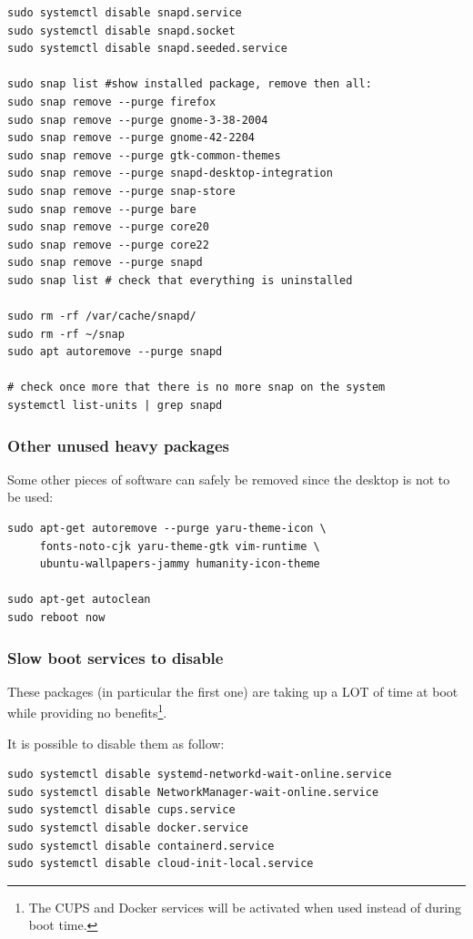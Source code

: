 \documentclass[10pt]{article}
\begin{document}
\begin{verbatim}
sudo systemctl disable snapd.service
sudo systemctl disable snapd.socket
sudo systemctl disable snapd.seeded.service

sudo snap list #show installed package, remove then all:
sudo snap remove --purge firefox
sudo snap remove --purge gnome-3-38-2004
sudo snap remove --purge gnome-42-2204
sudo snap remove --purge gtk-common-themes
sudo snap remove --purge snapd-desktop-integration
sudo snap remove --purge snap-store
sudo snap remove --purge bare
sudo snap remove --purge core20
sudo snap remove --purge core22
sudo snap remove --purge snapd
sudo snap list # check that everything is uninstalled

sudo rm -rf /var/cache/snapd/
sudo rm -rf ~/snap
sudo apt autoremove --purge snapd

# check once more that there is no more snap on the system
systemctl list-units | grep snapd 
\end{verbatim}

\subsubsection{Other unused heavy packages}
\label{sec:org7a93072}
Some other pieces of software can safely be removed since the desktop is
not to be used:

\begin{verbatim}
sudo apt-get autoremove --purge yaru-theme-icon \
     fonts-noto-cjk yaru-theme-gtk vim-runtime \
     ubuntu-wallpapers-jammy humanity-icon-theme

sudo apt-get autoclean
sudo reboot now
\end{verbatim}

\subsubsection{Slow boot services to disable}
\label{sec:org9ccd343}
These packages (in particular the first one) are taking up a LOT of time at boot while providing no benefits\footnote{The CUPS and Docker services will be activated when used instead of during boot time.}.

It is possible to disable them as follow:
\begin{verbatim}
sudo systemctl disable systemd-networkd-wait-online.service
sudo systemctl disable NetworkManager-wait-online.service
sudo systemctl disable cups.service
sudo systemctl disable docker.service
sudo systemctl disable containerd.service
sudo systemctl disable cloud-init-local.service
\end{verbatim}
\end{document}
